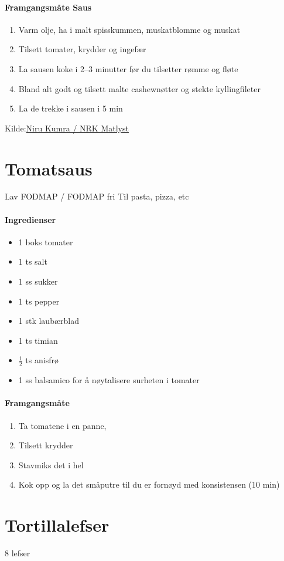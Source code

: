 \documentclass[12pt,a4paper]{book}
\begin{document}
{\paragraph{Framgangsmåte Saus}
\begin{enumerate}[noitemsep]
	\item Varm olje, ha i malt spisskummen, muskatblomme og muskat
	\item Tilsett tomater, krydder og ingefær
	\item La sausen koke i 2--3 minutter før du tilsetter rømme og fløte
	\item Bland alt godt og tilsett malte cashewnøtter og stekte kyllingfileter
	\item La de trekke i sausen i 5 min
\end{enumerate}


Kilde:\href{https://www.nrk.no/mat/nirus-chicken-tikka-masala-1.7314334}{Niru Kumra / NRK Matlyst}
\clearpage{}
\clearpage{}\section{﻿Tomatsaus}
Lav FODMAP / FODMAP fri
Til pasta, pizza, etc

\paragraph{Ingredienser}
\begin{itemize}[noitemsep]
	\item 1 boks tomater
	\item 1 ts salt
	\item 1 ss sukker
	\item 1 ts pepper
	\item 1 stk laubærblad
	\item 1 ts timian
	\item $\frac{1}{2}$ ts anisfrø
	\item 1 ss balsamico for å nøytalisere surheten i tomater
\end{itemize}

\paragraph{Framgangsmåte}
\begin{enumerate}[noitemsep]
	\item Ta tomatene i en panne,
	\item Tilsett krydder
	\item Stavmiks det i hel
	\item Kok opp og la det småputre til du er fornøyd med konsistensen (10 min)
\end{enumerate}
\clearpage{}
\clearpage{}\section{﻿Tortillalefser}
\label{tortillalefser}
8 lefser

}
\end{document}
